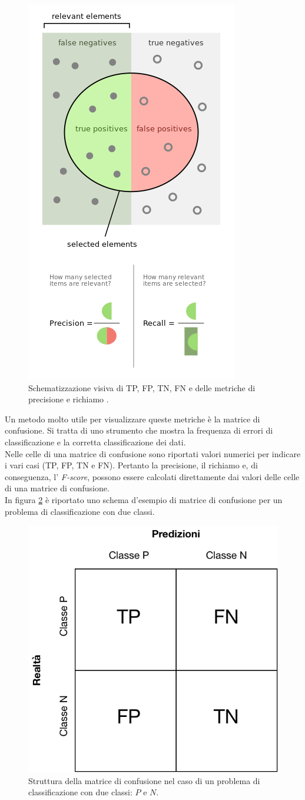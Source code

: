 \begin{figure}[ht]
\begin{center}
\includegraphics[width=0.4\columnwidth]{images/prec_ric.png}
\end{center}
\caption{Schematizzazione visiva di TP, FP, TN, FN e delle metriche di precisione e richiamo \cite{prec_ric:online}.}
\label{fig:prec_ric}
\end{figure}


Un metodo molto utile per visualizzare queste metriche è la matrice di confusione. Si tratta di uno strumento che mostra la frequenza di errori di classificazione e la corretta classificazione dei dati.\\
Nelle celle di una matrice di confusione sono riportati valori numerici per indicare i vari casi (TP, FP, TN e FN). Pertanto la precisione, il richiamo e, di conseguenza, l' \textit{F-score}, possono essere calcolati direttamente dai valori delle celle di una matrice di confusione.\\
In figura \ref{fig:conf_matr} è riportato uno schema d'esempio di matrice di confusione per un problema di classificazione con due classi.
\begin{figure}[ht]
\begin{center}
\includegraphics[width=0.5\columnwidth]{images/conf_matr_ok.png}
\end{center}
\caption{Struttura della matrice di confusione nel caso di un problema di classificazione con due classi: $P$ e $N$.}
\label{fig:conf_matr}
\end{figure}
